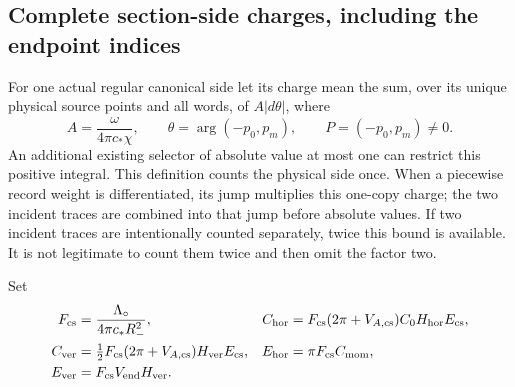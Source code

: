 \subsection{Complete section-side charges, including the endpoint indices}

For one actual regular canonical side let its charge mean the sum,
over its unique physical source points and all words, of
$A|d\theta|$, where
\[
 A=\frac{\omega}{4\pi c_*\chi},\qquad
 \theta=\arg(-p_0,p_m),\qquad
 P=(-p_0,p_m)\ne0.
\]
An additional existing selector of absolute value at most one can
restrict this positive integral.  This definition counts the physical
side once.  When a piecewise record weight is differentiated, its
jump multiplies this one-copy charge; the two incident traces are
combined into that jump before absolute values.  If two incident
traces are intentionally counted separately, twice this bound is
available.  It is not legitimate to count them twice and then omit
the factor two.

Set
\begin{align}
 F_{\rm cs}&=\frac{\Lambda_\circ}{4\pi c_*R_-^2},&
 C_{\rm hor}&=F_{\rm cs}(2\pi+V_{A,\rm cs})
                         C_0H_{\rm hor}E_{\rm cs},\notag\\
 C_{\rm ver}&=\tfrac12F_{\rm cs}(2\pi+V_{A,\rm cs})
                                      H_{\rm ver}E_{\rm cs},&
 E_{\rm hor}&=\pi F_{\rm cs}C_{\rm mom},\notag\\
 E_{\rm ver}&=F_{\rm cs}V_{\rm end}H_{\rm ver}.
                                                        \label{eq:cs-charge-constants}
\end{align}

